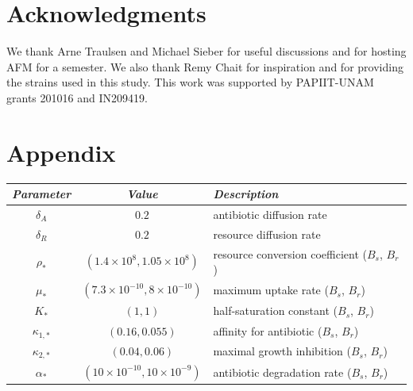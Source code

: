 \documentclass[fleqn,12pt]{wlscirep}
\begin{document}
\section*{Acknowledgments}
We thank Arne Traulsen and Michael Sieber for useful discussions and for hosting AFM for a semester. We also thank Remy Chait for inspiration and for providing the strains used in this study. This work was supported by PAPIIT-UNAM grants 201016 and IN209419.

\clearpage
\section*{Appendix}

\begin{center}
     \begin{tabular}{|c|c|l|} 
\hline
{\em Parameter} & {\em Value} & {\em Description} \\
\hline
\hline
$\delta_A$ &  $ 0.2 $ & antibiotic diffusion rate\\
$\delta_R$ &  $ 0.2 $ & resource diffusion rate\\
$\rho_*$ &  $ (1.4\times10^{8},1.05\times10^{8}) $ & resource conversion coefficient ($B_s$, $B_r$)\\
$\mu_*$ &  $ (7.3\times10^{-10},8\times10^{-10}) $ & maximum uptake rate ($B_s$, $B_r$)\\
$K_*$ &  $ (1,1) $ & half-saturation constant ($B_s$, $B_r$)\\
$\kappa_{1,*}$ &  $ (0.16,0.055) $ & affinity for antibiotic ($B_s$, $B_r$)\\
$\kappa_{2,*}$ &  $ (0.04,0.06) $ & maximal growth inhibition  ($B_s$, $B_r$)\\
$\alpha_*$ &  $ (10\times10^{-10},10\times10^{-9}) $ & antibiotic degradation rate ($B_s$, $B_r$)\\
\hline 
   \end{tabular}
\end{center}



\end{document}
